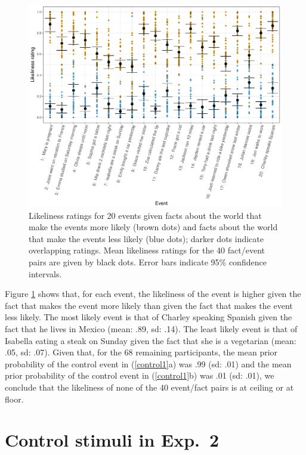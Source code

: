 \documentclass[11pt,fleqn]{article}
\newcommand{\6}{\mbox{$[\hspace*{-.6mm}[$}}
\newcommand{\9}{\mbox{$]\hspace*{-.6mm}]$}}
\begin{document}
\begin{figure}
\centering

\includegraphics[width=.8\paperwidth]{../results/1-prior/graphs/target-ratings}

\caption{Likeliness ratings for 20 events given facts about the world that make the events more likely (brown dots) and facts about the world that make the events less likely (blue dots); darker dots indicate overlapping ratings. Mean likeliness ratings for the 40 fact/event pairs are given by black dots. Error bars indicate 95\% confidence intervals.}\label{f-priors}
\end{figure}

Figure \ref{f-priors} shows that, for each event, the likeliness of the event is higher given the fact that makes the event more likely than given the fact that makes the event less likely. The most likely event is that of Charley speaking Spanish given the fact that he lives in Mexico (mean: .89, sd: .14). The least likely event is that of Isabella eating a steak on Sunday given the fact that she is a vegetarian (mean: .05, sd: .07). Given that, for the 68 remaining participants, the mean prior probability of the control event in (\ref{control1}a) was .99 (sd: .01) and the mean prior probability of the control event in (\ref{control1}b) was .01 (sd: .01), we conclude that the likeliness of none of the 40 event/fact pairs is at ceiling or at floor.

\section{Control stimuli in Exp.~2}\label{a-exp2-control}
\end{document}
